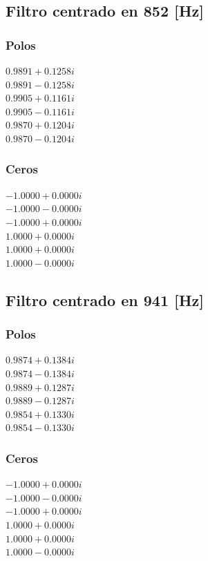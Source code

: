 \subsection*{Filtro centrado en 852 [Hz]}
\begin{multicols}{2}
  \subsubsection*{Polos}
  $0.9891 + 0.1258i$\\
  $0.9891 - 0.1258i$\\
  $0.9905 + 0.1161i$\\
  $0.9905 - 0.1161i$\\
  $0.9870 + 0.1204i$\\
  $0.9870 - 0.1204i$\\

  \columnbreak
  \subsubsection*{Ceros}
  $-1.0000 + 0.0000i$\\
  $-1.0000 - 0.0000i$\\
  $-1.0000 + 0.0000i$\\
  $1.0000 + 0.0000i$\\
  $1.0000 + 0.0000i$\\
  $1.0000 - 0.0000i$\\
\end{multicols}

\pagebreak

\subsection*{Filtro centrado en 941 [Hz]}
\begin{multicols}{2}
  \subsubsection*{Polos}
  $0.9874 + 0.1384i$\\
  $0.9874 - 0.1384i$\\
  $0.9889 + 0.1287i$\\
  $0.9889 - 0.1287i$\\
  $0.9854 + 0.1330i$\\
  $0.9854 - 0.1330i$\\

  \columnbreak
  \subsubsection*{Ceros}
  $-1.0000 + 0.0000i$\\
  $-1.0000 - 0.0000i$\\
  $-1.0000 + 0.0000i$\\
  $1.0000 + 0.0000i$\\
  $1.0000 + 0.0000i$\\
  $1.0000 - 0.0000i$\\
\end{multicols}

